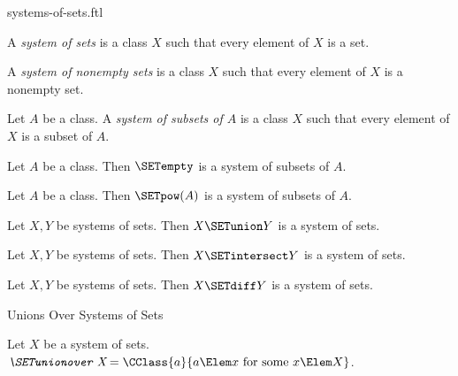\documentclass{stex}
\begin{document}
\begin{smodule}{systems-of-sets.ftl}

\begin{definition}[forthel,id=FOUNDATIONS_10_5805323570905088]
  A \emph{system of sets} is a class $X$ such that every element of $X$ is a set.
\end{definition}

\begin{definition}[forthel,id=FOUNDATIONS_10_1631952387964928]
  A \emph{system of nonempty sets} is a class $X$ such that every element of $X$ is a nonempty set.
\end{definition}

\begin{definition}[forthel,id=FOUNDATIONS_10_943381479948288]
  Let $A$ be a class.
  A \emph{system of subsets of $A$} is a class $X$ such that every element of $X$ is a subset of $A$.
\end{definition}

\begin{proposition}[forthel,id=FOUNDATIONS_10_8268633648136192]
  Let $A$ be a class.
  Then $\SETempty$ is a system of subsets of $A$.
\end{proposition}

\begin{proposition}[forthel,id=FOUNDATIONS_10_7546016869908480]
  Let $A$ be a class.
  Then $\SETpow(A)$ is a system of subsets of $A$.
\end{proposition}

\begin{proposition}[forthel,id=FOUNDATIONS_10_2794857209384572]
  Let $X, Y$ be systems of sets.
  Then $X \SETunion Y$ is a system of sets.
\end{proposition}

\begin{proposition}[forthel,id=FOUNDATIONS_10_1983754920483934]
  Let $X, Y$ be systems of sets.
  Then $X \SETintersect Y$ is a system of sets.
\end{proposition}

\begin{proposition}[forthel,id=FOUNDATIONS_10_0928495478392003]
  Let $X, Y$ be systems of sets.
  Then $X \SETdiff Y$ is a system of sets.
\end{proposition}

\begin{sfragment}{Unions Over Systems of Sets}
  \begin{definition}[forthel,id=FOUNDATIONS_10_541772562300928]
    Let $X$ be a system of sets.
    $\emph{\SETunionover X} = \CClass{a}{a \Elem x\text{ for some }x \Elem X}$.


\end{definition}
\end{sfragment}
\end{smodule}
\end{document}
